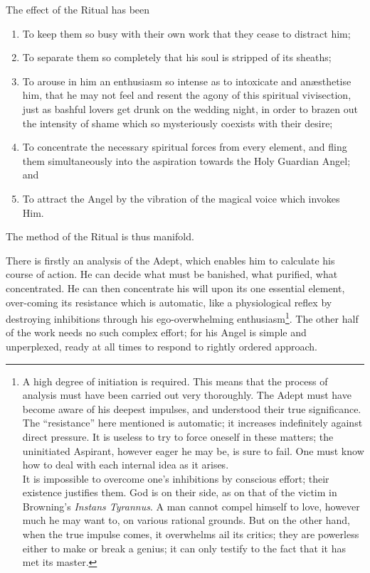 The effect of the Ritual has been

\begin{enumerate}[label=(\alph*)]
\item To keep them so busy with their own work that they cease to distract him;
\item To separate them so completely that his soul is stripped of its sheaths;
\item To arouse in him an enthusiasm so intense as to intoxicate and an\ae{}sthetise him, that he may not feel and resent the agony of this spiritual vivisection, just as bashful lovers get drunk on the wedding night, in order to brazen out the intensity of shame which so mysteriously coexists with their desire;
\item To concentrate the necessary spiritual forces from every element, and fling them simultaneously into the aspiration towards the Holy Guardian Angel; and
\item To attract the Angel by the vibration of the magical voice which invokes Him.
\end{enumerate}

The method of the Ritual is thus manifold.

There is firstly an analysis of the Adept, which enables him to calculate his course of action. He can decide what must be banished, what purified, what concentrated. He can then concentrate his will upon its one essential element, over-coming its resistance \textemdash{} which is automatic, like a physiological reflex \textemdash{} by destroying inhibitions through his ego-overwhelming enthusiasm\footnote{A high degree of initiation is required. This means that the process of analysis must have been carried out very thoroughly. The Adept must have become aware of his deepest impulses, and understood their true significance. The \enquote{resistance} here mentioned is automatic; it increases indefinitely against direct pressure. It is useless to try to force oneself in these matters; the uninitiated Aspirant, however eager he may be, is sure to fail. One must know how to deal with each internal idea as it arises. \\ It is impossible to overcome one's inhibitions by conscious effort; their existence justifies them. God is on their side, as on that of the victim in Browning's \textit{Instans Tyrannus}. A man cannot compel himself to love, however much he may want to, on various rational grounds. But on the other hand, when the true impulse comes, it overwhelms ail its critics; they are powerless either to make or break a genius; it can only testify to the fact that it has met its master.}. The other half of the work needs no such complex effort; for his Angel is simple and unperplexed, ready at all times to respond to rightly ordered approach.

